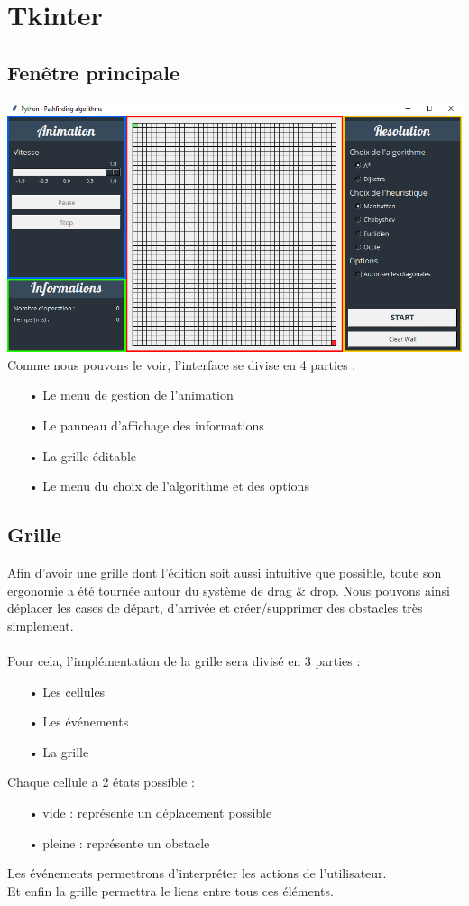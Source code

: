 \documentclass{report}
\begin{document}
\chapter{Tkinter}
	\section{Fenêtre principale}
		\includegraphics[scale=0.5]{UI.jpg}\\
		
		Comme nous pouvons le voir, l'interface se divise en 4 parties :
		\begin{itemize}
			\item[•] Le menu de gestion de l'animation
			\item[•] Le panneau d'affichage des informations
			\item[•] La grille éditable
			\item[•] Le menu du choix de l'algorithme et des options
		\end{itemize}
		
	\section{Grille}
	Afin d'avoir une grille dont l'édition soit aussi intuitive que possible, toute son ergonomie a été tournée autour du système de drag \& drop.
	Nous pouvons ainsi déplacer les cases de départ, d'arrivée et créer/supprimer des obstacles très simplement. \\\\
	Pour cela, l'implémentation de la grille sera divisé en 3 parties :
		\begin{itemize}
			\item[•] Les cellules
			\item[•] Les événements
			\item[•] La grille
		\end{itemize}
	\vspace{4mm}
	\vspace{4mm}
	Chaque cellule a 2 états possible :
		\begin{itemize}
			\item[•] vide : représente un déplacement possible
			\item[•] pleine : représente un obstacle
		\end{itemize}
	\vspace{4mm}
	Les événements permettrons d'interpréter les actions de l'utilisateur. \\
	Et enfin la grille permettra le liens entre tous ces éléments.
	
\end{document}

